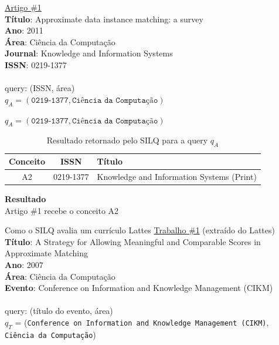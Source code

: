\documentclass{beamer}
\begin{document}
\begin{frame}
  \underline{Artigo \#1}\\
  \textbf{Título}: Approximate data instance matching: a survey\\
  \textbf{Ano}: 2011\\
  \textbf{Área}: Ciência da Computação\\
  \textbf{Journal}: Knowledge and Information Systems\\
  \textbf{ISSN}: 0219-1377\\

  \hfill \\
  query: (ISSN, área)\\
  $q_A = (\texttt{0219-1377}, \texttt{Ciência da Computação})$
\end{frame}

\begin{frame}
  $q_A = (\texttt{0219-1377}, \texttt{Ciência da Computação})$

  \pause
  \small
  \begin{table}
    \begin{tabular}{ c | c | p{7cm} }
      \textbf{Conceito} & \textbf{ISSN} & \textbf{Título}\\
      \hline \hline

      A2 & 0219-1377 & Knowledge and Information Systems (Print)\\
    \end{tabular}
    \caption{Resultado retornado pelo SILQ para a query $q_A$}
  \end{table}

  \pause
  \normalsize
  \textbf{Resultado}\\
  Artigo \#1 recebe o conceito A2
\end{frame}

\begin{frame}{Como o SILQ avalia um currículo Lattes}
  \underline{Trabalho \#1} (extraído do Lattes)\\
  \textbf{Título}: A Strategy for Allowing Meaningful and Comparable Scores in Approximate Matching\\
  \textbf{Ano}: 2007\\
  \textbf{Área}: Ciência da Computação\\
  \textbf{Evento}: Conference on Information and Knowledge Management (CIKM)\\

  \pause
  \hfill \\
  query: (título do evento, área)\\
  $q_T$ = (\texttt{Conference on Information and Knowledge Management (CIKM)}, \texttt{Ciência da Computação})
\end{frame}
\end{document}
